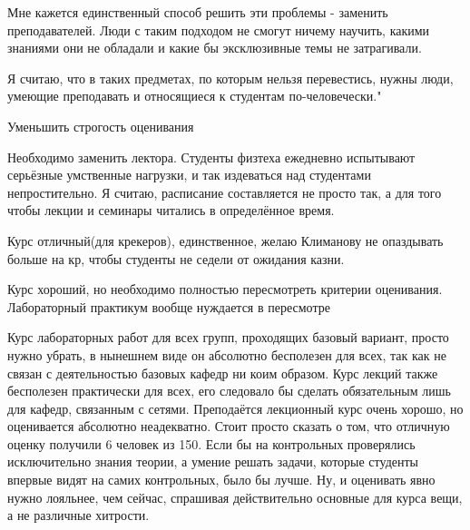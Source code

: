         \begin{commentbox}
			Мне кажется единственный способ решить эти проблемы - заменить преподавателей. Люди с таким подходом не смогут ничему научить, какими знаниями они не обладали и какие бы эксклюзивные темы не затрагивали. 

            Я считаю, что в таких предметах, по которым нельзя перевестись, нужны люди, умеющие преподавать и относящиеся к студентам по-человечески."
		\end{commentbox}

        \begin{commentbox}
			Уменьшить строгость оценивания
		\end{commentbox}

        \begin{commentbox}
			Необходимо заменить лектора. Студенты физтеха ежедневно испытывают серьёзные умственные нагрузки, и так издеваться над студентами  непростительно. Я считаю, расписание составляется не просто так, а для того чтобы лекции и семинары читались в определённое время.
		\end{commentbox}

        \begin{commentbox}
			Курс отличный(для крекеров), единственное, желаю Климанову не опаздывать больше на кр, чтобы студенты не седели от ожидания казни. 
		\end{commentbox}

        \begin{commentbox}
			Курс хороший, но необходимо полностью пересмотреть критерии оценивания. Лабораторный практикум вообще нуждается в пересмотре
		\end{commentbox}

        \begin{commentbox}
			Курс лабораторных работ для всех групп, проходящих базовый вариант, просто нужно убрать, в нынешнем виде он абсолютно бесполезен для всех, так как не связан с деятельностью базовых кафедр ни коим образом. Курс лекций также бесполезен практически для всех, его следовало бы сделать обязательным лишь для кафедр, связанным с сетями. Преподаётся лекционный курс очень хорошо, но оценивается абсолютно неадекватно. Стоит просто сказать о том, что отличную оценку получили 6 человек из 150. Если бы на контрольных проверялись исключительно знания теории, а умение решать задачи, которые студенты впервые видят на самих контрольных, было бы лучше. Ну, и оценивать явно нужно лояльнее, чем сейчас, спрашивая действительно основные для курса вещи, а не различные хитрости.
		\end{commentbox}

